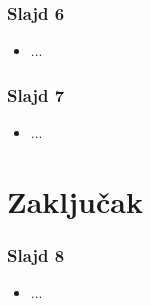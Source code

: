 \documentclass[14pt]{beamer}
\begin{document}
\begin{frame}[fragile]\frametitle{Slajd 6}
	\begin{itemize}	
		\item ...
	\end{itemize}
\end{frame}

\begin{frame}[fragile]\frametitle{Slajd 7}
	\begin{itemize}	
		\item ...
	\end{itemize}
\end{frame}

\section{Zaključak}

\begin{frame}[fragile]\frametitle{Slajd 8}
	\begin{itemize}	
		\item ...
	\end{itemize}
\end{frame}
\end{document}
